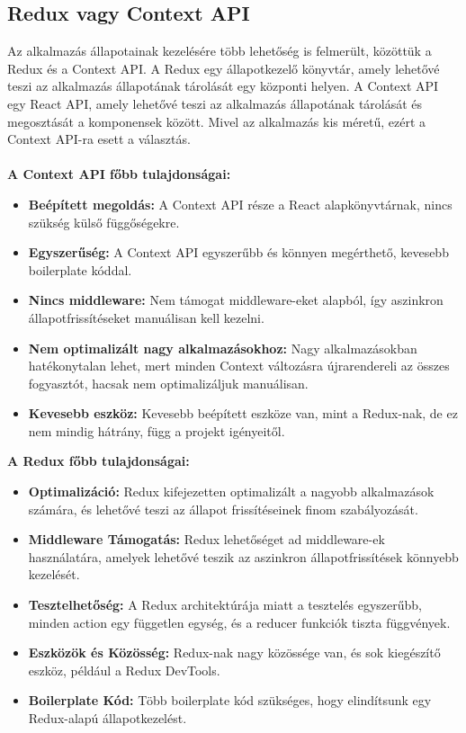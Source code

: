 \subsection{Redux vagy Context API}
Az alkalmazás állapotainak kezelésére több lehetőség is felmerült, közöttük a Redux és a Context API.
A Redux \cite[]{redux} egy állapotkezelő könyvtár, amely lehetővé teszi az alkalmazás állapotának tárolását egy központi helyen.
A Context API egy React API, amely lehetővé teszi az alkalmazás állapotának tárolását és megosztását a komponensek között.
Mivel az alkalmazás kis méretű, ezért a Context API-ra esett a választás.
\\
\\
\textbf{A Context API főbb tulajdonságai:}
\begin{itemize}
    \item \textbf{Beépített megoldás:} A Context API része a React alapkönyvtárnak, nincs szükség külső függőségekre.
    \item \textbf{Egyszerűség:} A Context API egyszerűbb és könnyen megérthető, kevesebb boilerplate kóddal.
    \item \textbf{Nincs middleware:} Nem támogat middleware-eket alapból, így aszinkron állapotfrissítéseket manuálisan kell kezelni.
    \item \textbf{Nem optimalizált nagy alkalmazásokhoz:} Nagy alkalmazásokban hatékonytalan lehet, mert minden Context változásra újrarendereli az összes fogyasztót, hacsak nem optimalizáljuk manuálisan.
    \item \textbf{Kevesebb eszköz:} Kevesebb beépített eszköze van, mint a Redux-nak, de ez nem mindig hátrány, függ a projekt igényeitől.
\end{itemize}

\textbf{A Redux főbb tulajdonságai:}
\begin{itemize}
    \item \textbf{Optimalizáció:} Redux kifejezetten optimalizált a nagyobb alkalmazások számára, és lehetővé teszi az állapot frissítéseinek finom szabályozását.
    \item \textbf{Middleware Támogatás:} Redux lehetőséget ad middleware-ek használatára, amelyek lehetővé teszik az aszinkron állapotfrissítések könnyebb kezelését.
    \item \textbf{Tesztelhetőség:} A Redux architektúrája miatt a tesztelés egyszerűbb, minden action egy független egység, és a reducer funkciók tiszta függvények.
    \item \textbf{Eszközök és Közösség:} Redux-nak nagy közössége van, és sok kiegészítő eszköz, például a Redux DevTools.
    \item \textbf{Boilerplate Kód:} Több boilerplate kód szükséges, hogy elindítsunk egy Redux-alapú állapotkezelést.
\end{itemize}

